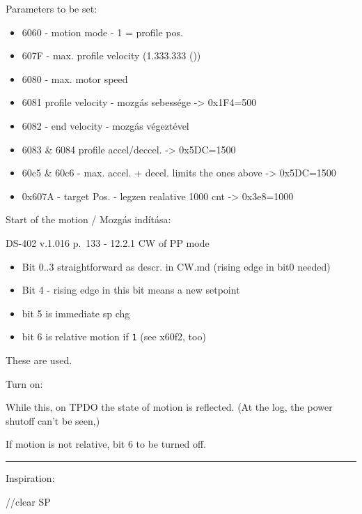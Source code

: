 Parameters to be set:

\begin{itemize}
\item
  6060 - motion mode - 1 = profile pos.
\item
  607F - max. profile velocity (1.333.333 ())
\item
  6080 - max. motor speed
\item
  6081 profile velocity - mozgás sebessége -\textgreater{} 0x1F4=500
\item
  6082 - end velocity - mozgás végeztével
\item
  6083 \& 6084 profile accel/deccel. -\textgreater{} 0x5DC=1500
\item
  60c5 \& 60c6 - max. accel. + decel. limits the ones above
  -\textgreater{} 0x5DC=1500
\item
  0x607A - target Pos. - legzen realative 1000 cnt -\textgreater{}
  0x3e8=1000
\end{itemize}

Start of the motion / Mozgás indítása:

DS-402 v.1.016 p.~133 - 12.2.1 CW of PP mode

\begin{itemize}
\itemsep1pt\parskip0pt
\item
  Bit 0..3 straightforward as descr. in CW.md (rising edge in bit0
  needed)
\item
  Bit 4 - rising edge in this bit means a new setpoint
\item
  bit 5 is immediate sp chg
\item
  bit 6 is relative motion if \texttt{1} (see x60f2, too)
\end{itemize}

These are used.

Turn on:


While this, on TPDO the state of motion is reflected. (At the log, the
power shutoff can't be seen,)

If motion is not relative, bit 6 to be turned off.

\begin{center}\rule{3in}{0.4pt}\end{center}

Inspiration:


//clear SP
